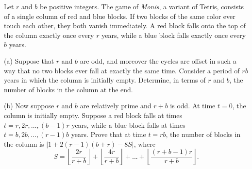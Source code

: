 Let $r$ and $b$ be positive integers. The game of \textit{Monis}, a variant of Tetris, consists of a single column of red and blue blocks.  If two blocks of the same color ever touch each other, they both vanish immediately.  A red block falls onto the top of the column exactly once every $r$ years, while a blue block falls exactly once every $b$ years.

(a) Suppose that $r$ and $b$ are odd, and moreover the cycles are offset in such a way that no two blocks ever fall at exactly the same time.  Consider a period of $rb$ years in which the column is initially empty.  Determine, in terms of $r$ and $b$, the number of blocks in the column at the end.

(b) Now suppose $r$ and $b$ are relatively prime and $r+b$ is odd.  At time $t=0$, the column is initially empty.  Suppose a red block falls at times $t = r, 2r, \dots, (b-1)r$ years, while a blue block falls at times $t = b, 2b, \dots, (r-1)b$ years.  Prove that at time $t=rb$, the number of blocks in the column is $\left\lvert 1+2(r-1)(b+r)-8S \right\rvert$, where \[ S = \left\lfloor \frac{2r}{r+b} \right\rfloor
     + \left\lfloor \frac{4r}{r+b} \right\rfloor
     + ...
     + \left\lfloor \frac{(r+b-1)r}{r+b} \right\rfloor
     . \]
